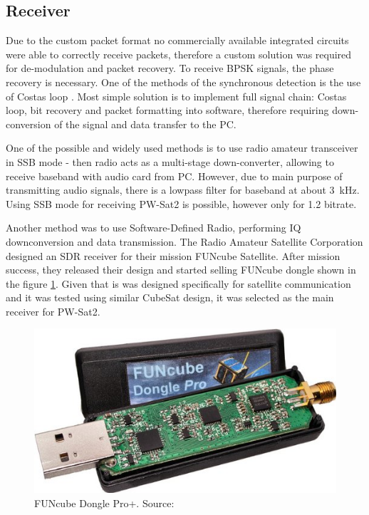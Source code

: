 \subsection{Receiver}
Due to the custom packet format no commercially available integrated circuits were able to correctly receive packets, therefore a custom solution was required for de-modulation and packet recovery.
To receive BPSK signals, the phase recovery is necessary. One of the methods of the synchronous detection is the use of Costas loop \cite{costas_loop}. Most simple solution is to implement full signal chain: Costas loop, bit recovery and packet formatting into software, therefore requiring down-conversion of the signal and data transfer to the PC. 

One of the possible and widely used methods is to use radio amateur transceiver in SSB mode - then radio acts as a multi-stage down-converter, allowing to receive baseband with audio card from PC. However, due to main purpose of transmitting audio signals, there is a lowpass filter for baseband at about \SI{3}{\kHz}. Using SSB mode for receiving PW-Sat2 is possible, however only for \SI{1.2}{\kbps} bitrate.

Another method was to use Software-Defined Radio, performing IQ downconversion and data transmission. The Radio Amateur Satellite Corporation designed an SDR receiver for their mission FUNcube Satellite. After mission success, they released their design and started selling FUNcube dongle shown in the figure \ref{funcube_pic}. Given that is was designed specifically for satellite communication and it was tested using similar CubeSat design, it was selected as the main receiver for PW-Sat2.

\begin{figure}[H]
    \centering
    \includegraphics[width=0.6\paperwidth]{img/2/funcube.jpg}
    \caption{FUNcube Dongle Pro+. Source: \cite{funcube}}
    \label{funcube_pic}
\end{figure}

